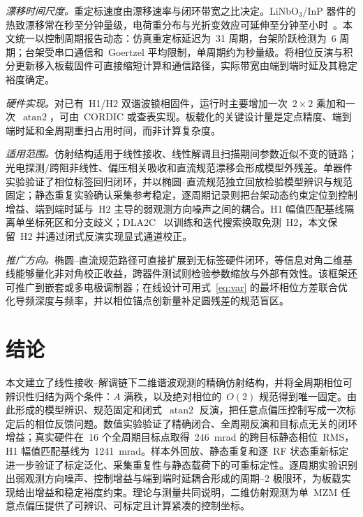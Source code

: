 \documentclass[journal]{IEEEtran}
\theoremstyle{plain}
\theoremstyle{remark}
\newcommand{\atan}{\operatorname{atan2}}
\begin{document}
\emph{漂移时间尺度。}重定标速度由漂移速率与闭环带宽之比决定。LiNbO$_3$/InP 器件的热致漂移常在秒至分钟量级，电荷重分布与光折变效应可延伸至分钟至小时~\cite{salvestrini2011,chen2011}。本文统一以控制周期报告动态：仿真重定标延迟为~31 周期，台架阶跃检测为~6 周期；台架受串口通信和~Goertzel 平均限制，单周期约为秒量级。将相位反演与积分更新移入板载固件可直接缩短计算和通信路径，实际带宽由端到端时延及其稳定裕度确定。

\emph{硬件实现。}对已有~H1/H2 双谐波锁相固件，运行时主要增加一次~$2{\times}2$ 乘加和一次~$\atan$，可由~CORDIC 或查表实现。板载化的关键设计量是定点精度、端到端时延和全周期重扫占用时间，而非计算复杂度。

\emph{适用范围。}仿射结构适用于线性接收、线性解调且扫描期间参数近似不变的链路；光电探测/跨阻非线性、偏压相关吸收和直流规范漂移会形成模型外残差。单器件实验验证了相位标签回归闭环，并以椭圆--直流规范独立回放检验模型辨识与规范固定；静态重复实验确认采集参考稳定，逐周期记录则把台架动态约束定位到控制增益、端到端时延与~H2 主导的弱观测方向噪声之间的耦合。H1 幅值匹配基线隔离单坐标死区和分支歧义；DLA2C~\cite{hu2026dla2c} 以训练和迭代搜索换取免测~H2，本文保留~H2 并通过闭式反演实现显式通道校正。

\emph{推广方向。}椭圆--直流规范路径可直接扩展到无标签硬件闭环，等信息对角二维基线能够量化非对角校正收益，跨器件测试则检验参数缩放与外部有效性。该框架还可推广到嵌套或多电极调制器；在线设计可用式~\eqref{eq:var} 的最坏相位方差联合优化导频深度与频率，并以相位锚点创新量补足圆残差的规范盲区。

\section{结论}
本文建立了线性接收--解调链下二维谐波观测的精确仿射结构，并将全周期相位可辨识性归结为两个条件：$A$ 满秩，以及绝对相位的~$O(2)$ 规范得到唯一固定。由此形成的模型辨识、规范固定和闭式~$\atan$ 反演，把任意点偏压控制写成一次标定后的相位反馈问题。数值实验验证了精确闭合、全周期反演和目标点无关的闭环增益；真实硬件在~16 个全周期目标点取得~246~mrad 的跨目标静态相位~RMS，H1 幅值匹配基线为~1241~mrad。样本外回放、静态重复和逐~RF 状态重新标定进一步验证了标定泛化、采集重复性与静态载荷下的可重标定性。逐周期实验识别出弱观测方向噪声、控制增益与端到端时延耦合形成的周期--2 极限环，为板载实现给出增益和稳定裕度约束。理论与测量共同说明，二维仿射观测为单~MZM 任意点偏压提供了可辨识、可标定且计算紧凑的控制坐标。
\end{document}
